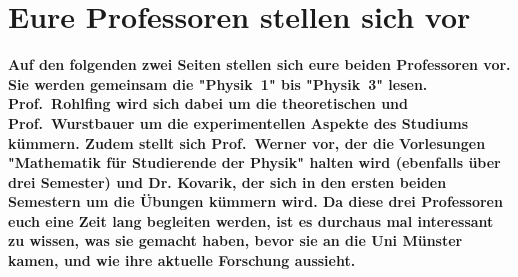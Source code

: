 \section[Eure Profs stellen sich vor]{Eure Professoren stellen sich vor}
\textbf{Auf den folgenden zwei Seiten stellen sich eure beiden Professoren vor.
    Sie werden gemeinsam die "Physik~1" bis "Physik~3" lesen.
    Prof.\ Rohlfing wird sich dabei um die theoretischen und Prof.\ Wurstbauer um die experimentellen Aspekte des Studiums kümmern.
    Zudem stellt sich Prof.\ Werner vor, der die Vorlesungen "Mathematik für Studierende der Physik" halten wird (ebenfalls über drei Semester) und Dr. Kovarik, der sich in den ersten beiden Semestern um die Übungen kümmern wird.
	Da diese drei Professoren euch eine Zeit lang begleiten werden, ist es durchaus mal interessant zu wissen, was sie gemacht haben, bevor sie an die Uni Münster kamen, und wie ihre aktuelle Forschung aussieht.}

